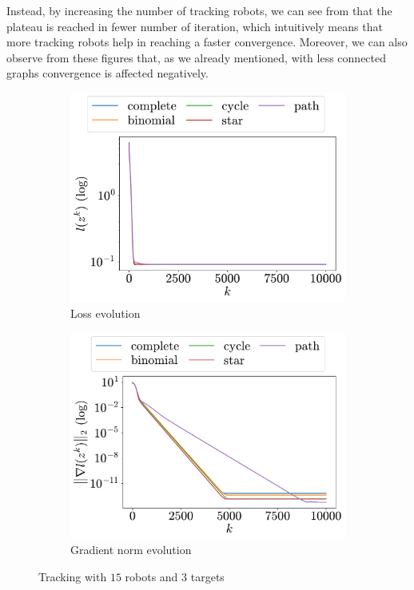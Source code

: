 \documentclass[a4paper,11pt,oneside]{book}
\begin{document}
Instead, by increasing the number of tracking robots, we can see from  that the plateau is reached in fewer number of iteration, which intuitively means that more tracking robots help in reaching a faster convergence. Moreover, we can also observe from these figures that, as we already mentioned, with less connected graphs convergence is affected negatively.

\begin{figure}[H]
      \centering
      \begin{subfigure}[t]{0.48\linewidth}
            \centering
            \includegraphics[width=\linewidth]{./figs/tracking/15_3_2/loss.pdf} 
            \caption{Loss evolution}
      \end{subfigure}
      \hfill
      \begin{subfigure}[t]{0.48\linewidth}
            \centering
            \includegraphics[width=\linewidth]{./figs/tracking/15_3_2/gradient.pdf} 
            \caption{Gradient norm evolution}
      \end{subfigure}
      \caption{Tracking with $15$ robots and $3$ targets}
      \label{fig:tracking_15_3}
\end{figure}
\end{document}
